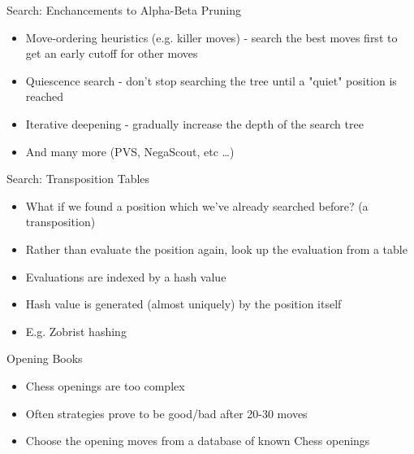 \documentclass[xcolor=pdftex,dvipsnames,table]{beamer}
\begin{document}
\begin{frame}{Search: Enchancements to Alpha-Beta Pruning}
\begin{itemize}
\item Move-ordering heuristics (e.g. killer moves) - search the best moves first to get an early cutoff for other moves
\item Quiescence search - don't stop searching the tree until a "quiet" position is reached
\item Iterative deepening - gradually increase the depth of the search tree
\item And many more (PVS, NegaScout, etc \dots)
\end{itemize}
\end{frame}

\begin{frame}{Search: Transposition Tables}
\begin{itemize}
\item What if we found a position which we've already searched before? (a transposition)
\item Rather than evaluate the position again, look up the evaluation from a table
\item Evaluations are indexed by a hash value
\item Hash value is generated (almost uniquely) by the position itself
\item E.g. Zobrist hashing
\end{itemize}
\end{frame}


\begin{frame}{Opening Books}
\begin{itemize}
\item Chess openings are too complex
\item Often strategies prove to be good/bad after 20-30 moves
\item Choose the opening moves from a database of known Chess openings
\end{itemize}
\end{frame}
\end{document}
